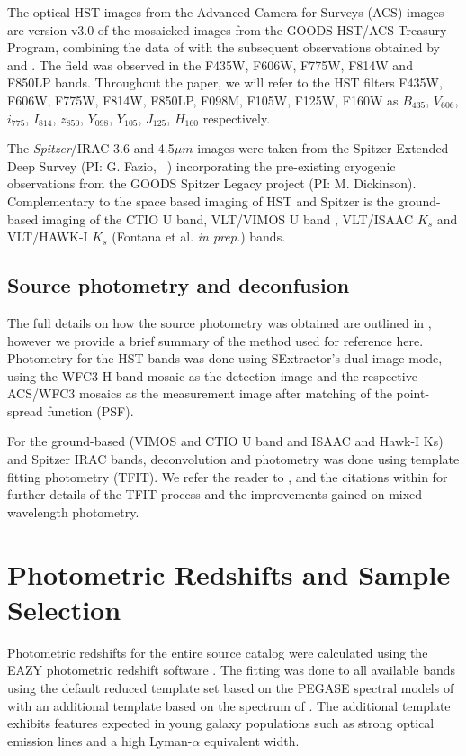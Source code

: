 The optical HST images from the Advanced Camera for Surveys (ACS) images are version v3.0 of the mosaicked images from the GOODS HST/ACS Treasury Program, combining the data of \citet{2004ApJ...600L..93G} with the subsequent observations obtained by \citet{2006AJ....132.1729B} and \citep{Koekemoer:2011br}. The field was observed in the F435W, F606W, F775W, F814W and F850LP bands. Throughout the paper, we will refer to the HST filters F435W, F606W, F775W, F814W, F850LP, F098M, F105W, F125W, F160W as $B_{435}$, $V_{606}$, $i_{775}$, $I_{814}$, $z_{850}$, $Y_{098}$, $Y_{105}$, $J_{125}$, $H_{160}$ respectively. 

The \emph{Spitzer}/IRAC \citep{Fazio:2004eb} 3.6 and 4.5$\mu m$ images were taken from the Spitzer Extended Deep Survey (PI: G. Fazio, \citeauthor{Ashby:2013cc}~\citeyear{Ashby:2013cc}) incorporating the pre-existing cryogenic observations from the GOODS Spitzer Legacy project (PI: M. Dickinson). Complementary to the space based imaging of HST and Spitzer is the ground-based imaging of the CTIO U band, VLT/VIMOS U band \citep{Nonino:2009hf}, VLT/ISAAC $K_{s}$ \citep{Retzlaff:2010co} and VLT/HAWK-I $K_{s}$ (Fontana et al. \emph{in prep.}) bands.

\subsection{Source photometry and deconfusion}
The full details on how the source photometry was obtained are outlined in \citet{Guo:2013ig}, however we provide a brief summary of the method used for reference here. Photometry for the HST bands was done using SExtractor's dual image mode, using the WFC3 H band mosaic as the detection image and the respective ACS/WFC3 mosaics as the measurement image after matching of the point-spread function (PSF). 

For the ground-based (VIMOS and CTIO U band and ISAAC and Hawk-I Ks) and Spitzer IRAC bands, deconvolution and photometry was done using template fitting photometry (TFIT). We refer the reader to \citet{Laidler:2007iy}, \citet{2012ApJ...752...66L} and the citations within for further details of the TFIT process and the improvements gained on mixed wavelength photometry.

\section{Photometric Redshifts and Sample Selection}\label{sec:redshift}
Photometric redshifts for the entire source catalog were calculated using the EAZY photometric redshift software \citep{Brammer:2008gn}. The fitting was done to all available bands using the default reduced template set based on the PEGASE spectral models of \citet{1997A&A...326..950F} with an additional template based on the spectrum of \citet{2010ApJ...719.1168E}. The additional template exhibits features expected in young galaxy populations such as strong optical emission lines and a high Lyman-$\alpha$ equivalent width.

